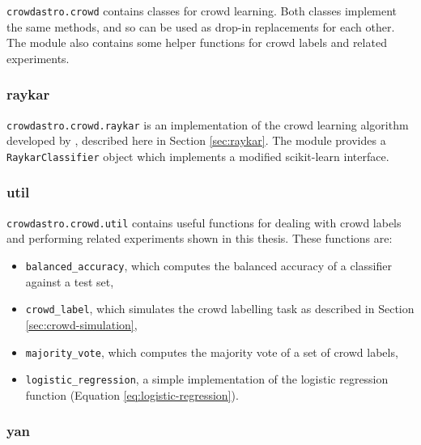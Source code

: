         \texttt{crowdastro.crowd} contains classes for crowd learning. Both
        classes implement the same methods, and so can be used as drop-in
        replacements for each other. The module also contains some helper
        functions for crowd labels and related experiments.

        \subsubsection{raykar}
            \label{sec:crowdastro-raykar}

            \texttt{crowdastro.crowd.raykar} is an implementation of the crowd
            learning algorithm developed by \citet{raykar10}, described here in
            Section \ref{sec:raykar}. The module provides a
            \texttt{RaykarClassifier} object which implements a modified
            scikit-learn interface.

        \subsubsection{util}
            \label{sec:crowdastro-util}

            \texttt{crowdastro.crowd.util} contains useful functions for dealing
            with crowd labels and performing related experiments shown in this
            thesis. These functions are:
            \begin{itemize}
                \item \texttt{balanced\_accuracy}, which computes the balanced
                    accuracy of a classifier against a test set,
                \item \texttt{crowd\_label}, which simulates the crowd labelling
                    task as described in Section \ref{sec:crowd-simulation},
                \item \texttt{majority\_vote}, which computes the majority vote
                    of a set of crowd labels,
                \item \texttt{logistic\_regression}, a simple implementation of
                    the logistic regression function (Equation
                    \ref{eq:logistic-regression}).
            \end{itemize}

        \subsubsection{yan}
            \label{sec:crowdastro-yan}


